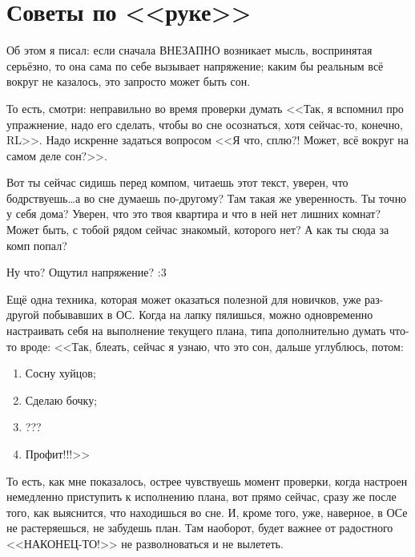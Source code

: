 \documentclass[a4paper,14pt,oneside]{memoir}
\begin{document}
\chapter{Советы по <<руке>>}


\medskip

Об этом я писал: если сначала ВНЕЗАПНО возникает мысль, воспринятая серьёзно, то она сама по себе вызывает напряжение; каким бы реальным всё вокруг не казалось, это запросто может быть сон.

То есть, смотри: неправильно во время проверки думать <<Так, я вспомнил про упражнение, надо его сделать, чтобы во сне осознаться, хотя сейчас-то, конечно, RL>>. Надо искренне задаться вопросом <<Я что, сплю?! Может, всё вокруг на самом деле сон?>>.

Вот ты сейчас сидишь перед компом, читаешь этот текст, уверен, что бодрствуешь\ldots а во сне думаешь по-другому? Там такая же уверенность. 
Ты точно у себя дома? Уверен, что это твоя квартира и что в ней нет лишних комнат? Может быть, с тобой рядом сейчас знакомый, которого нет? А как ты сюда за комп попал? 

Ну что? Ощутил напряжение? :3

Ещё одна техника, которая может оказаться полезной для новичков, уже раз-другой побывавших в ОС. Когда на лапку пялишься, можно одновременно настраивать себя на выполнение текущего плана, типа дополнительно думать что-то вроде: <<Так, блеать, сейчас я узнаю, что это сон, дальше углублюсь, потом:
\begin{enumerate}
\item Сосну хуйцов;
\item Сделаю бочку;
\item ???
\item Профит!!!>>
\end{enumerate}

То есть, как мне показалось, острее чувствуешь момент проверки, когда настроен немедленно приступить к исполнению плана, вот прямо сейчас, сразу же после того, как выяснится, что находишься во сне. И, кроме того, уже, наверное, в ОСе не растеряешься, не забудешь план. Там наоборот, будет важнее от радостного <<НАКОНЕЦ-ТО!>> не разволноваться и не вылететь.
\end{document}
